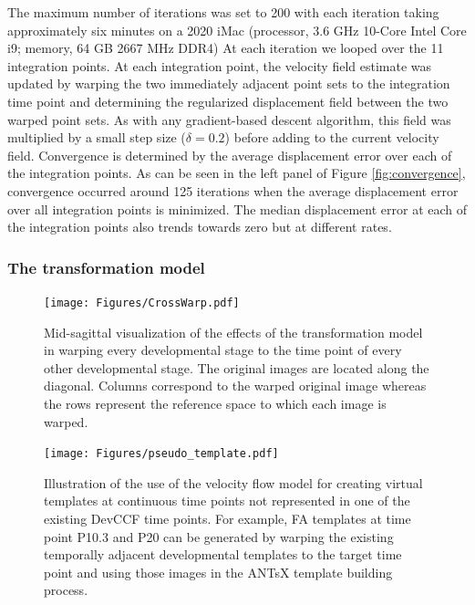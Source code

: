 \documentclass[
  12pt,
]{article}
\begin{document}
The maximum number of iterations was set to 200 with each iteration
taking approximately six minutes on a 2020 iMac (processor, 3.6 GHz
10-Core Intel Core i9; memory, 64 GB 2667 MHz DDR4) At each iteration we
looped over the 11 integration points. At each integration point, the
velocity field estimate was updated by warping the two immediately
adjacent point sets to the integration time point and determining the
regularized displacement field between the two warped point sets. As
with any gradient-based descent algorithm, this field was multiplied by
a small step size (\(\delta = 0.2\)) before adding to the current
velocity field. Convergence is determined by the average displacement
error over each of the integration points. As can be seen in the left
panel of Figure \ref{fig:convergence}, convergence occurred around 125
iterations when the average displacement error over all integration
points is minimized. The median displacement error at each of the
integration points also trends towards zero but at different rates.

\subsubsection{The transformation model}\label{the-transformation-model}

\begin{figure}[!htb]
\centering
\texttt{[image: Figures/CrossWarp.pdf]}
\caption{Mid-sagittal visualization of the effects of the transformation model in
warping every developmental stage to the time point of every other developmental
stage.  The original images are located along the diagonal.  Columns correspond
to the warped original image whereas the rows represent the reference space to which
each image is warped.}
\label{fig:crosswarp}
\end{figure}

\begin{figure}[!htb]
\centering
\texttt{[image: Figures/pseudo\_template.pdf]}
\caption{Illustration of the use of the velocity flow model for creating virtual templates
at continuous time points not represented in one of the existing DevCCF time points.
For example, FA templates at time point P10.3 and P20 can be generated by warping the 
existing temporally adjacent developmental templates to the target time point and using 
those images in the ANTsX template building process.}
\label{fig:virtual}
\end{figure}
\end{document}
